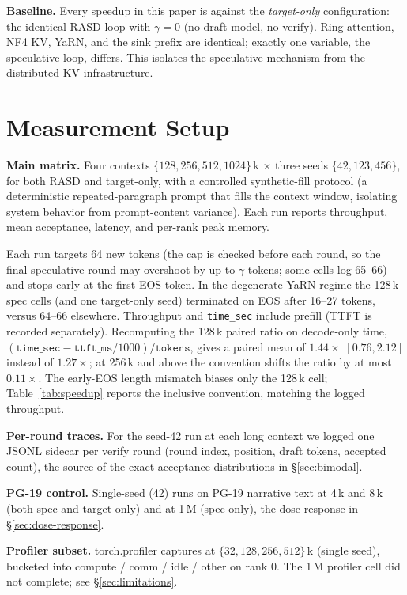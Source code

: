 \documentclass{article}
\begin{document}
\textbf{Baseline.} Every speedup in this paper is against the
\emph{target-only} configuration: the identical RASD loop with
$\gamma=0$ (no draft model, no verify). Ring attention, NF4 KV,
YaRN, and the sink prefix are identical; exactly one variable,
the speculative loop, differs. This isolates the speculative
mechanism from the distributed-KV infrastructure.

\section{Measurement Setup}
\label{sec:setup}

\textbf{Main matrix.} Four contexts
$\{128, 256, 512, 1024\}$\,k $\times$ three seeds
$\{42, 123, 456\}$, for both RASD and target-only, with a
controlled synthetic-fill protocol (a deterministic
repeated-paragraph prompt that fills the context window,
isolating system behavior from prompt-content variance). Each run
reports throughput, mean acceptance, latency, and per-rank peak
memory.

Each run targets 64 new tokens (the cap is checked before each
round, so the final speculative round may overshoot by up to
$\gamma$ tokens; some cells log 65--66) and stops early at the
first EOS token. In the degenerate YaRN regime the 128\,k spec
cells (and one target-only seed) terminated on EOS after 16--27
tokens, versus 64--66 elsewhere. Throughput and \texttt{time\_sec}
include prefill (TTFT is recorded separately). Recomputing the
128\,k paired ratio on decode-only time,
$(\texttt{time\_sec} - \texttt{ttft\_ms}/1000)/\texttt{tokens}$,
gives a paired mean of $1.44\times$ $[0.76, 2.12]$ instead of
$1.27\times$; at 256\,k and above the convention shifts the ratio
by at most $0.11\times$. The early-EOS length mismatch biases only
the 128\,k cell; Table~\ref{tab:speedup} reports the inclusive
convention, matching the logged throughput.

\textbf{Per-round traces.} For the seed-42 run at each long
context we logged one JSONL sidecar per verify round (round index,
position, draft tokens, accepted count), the source of the
exact acceptance distributions in \S\ref{sec:bimodal}.

\textbf{PG-19 control.} Single-seed (42) runs on PG-19 narrative
text \citep{rae2019pg19} at 4\,k and 8\,k (both spec and
target-only) and at 1\,M (spec only), the dose-response in
\S\ref{sec:dose-response}.

\textbf{Profiler subset.} torch.profiler captures at
$\{32, 128, 256, 512\}$\,k (single seed), bucketed into compute /
comm / idle / other on rank 0. The 1\,M profiler cell did not
complete; see \S\ref{sec:limitations}.
\end{document}
